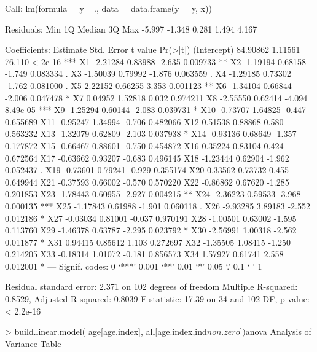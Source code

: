 Call:
lm(formula = y ~ ., data = data.frame(y = y, x))

Residuals:
   Min     1Q Median     3Q    Max 
-5.997 -1.348  0.281  1.494  4.167 

Coefficients:
            Estimate Std. Error t value Pr(>|t|)    
(Intercept) 84.90862    1.11561  76.110  < 2e-16 ***
X1          -2.21284    0.83988  -2.635 0.009733 ** 
X2          -1.19194    0.68158  -1.749 0.083334 .  
X3          -1.50039    0.79992  -1.876 0.063559 .  
X4          -1.29185    0.73302  -1.762 0.081000 .  
X5           2.22152    0.66255   3.353 0.001123 ** 
X6          -1.34104    0.66844  -2.006 0.047478 *  
X7           0.04952    1.52818   0.032 0.974211    
X8          -2.55550    0.62414  -4.094 8.49e-05 ***
X9          -1.25294    0.60144  -2.083 0.039731 *  
X10         -0.73707    1.64825  -0.447 0.655689    
X11         -0.95247    1.34994  -0.706 0.482066    
X12          0.51538    0.88868   0.580 0.563232    
X13         -1.32079    0.62809  -2.103 0.037938 *  
X14         -0.93136    0.68649  -1.357 0.177872    
X15         -0.66467    0.88601  -0.750 0.454872    
X16          0.35224    0.83104   0.424 0.672564    
X17         -0.63662    0.93207  -0.683 0.496145    
X18         -1.23444    0.62904  -1.962 0.052437 .  
X19         -0.73601    0.79241  -0.929 0.355174    
X20          0.33562    0.73732   0.455 0.649944    
X21         -0.37593    0.66002  -0.570 0.570220    
X22         -0.86862    0.67620  -1.285 0.201853    
X23         -1.78443    0.60955  -2.927 0.004215 ** 
X24         -2.36223    0.59533  -3.968 0.000135 ***
X25         -1.17843    0.61988  -1.901 0.060118 .  
X26         -9.93285    3.89183  -2.552 0.012186 *  
X27         -0.03034    0.81001  -0.037 0.970191    
X28         -1.00501    0.63002  -1.595 0.113760    
X29         -1.46378    0.63787  -2.295 0.023792 *  
X30         -2.56991    1.00318  -2.562 0.011877 *  
X31          0.94415    0.85612   1.103 0.272697    
X32         -1.35505    1.08415  -1.250 0.214205    
X33         -0.18314    1.01072  -0.181 0.856573    
X34          1.57927    0.61741   2.558 0.012001 *  
---
Signif. codes:  0 ‘***’ 0.001 ‘**’ 0.01 ‘*’ 0.05 ‘.’ 0.1 ‘ ’ 1

Residual standard error: 2.371 on 102 degrees of freedom
Multiple R-squared:  0.8529,	Adjusted R-squared:  0.8039 
F-statistic: 17.39 on 34 and 102 DF,  p-value: < 2.2e-16







> build.linear.model( age[age.index], all[age.index,ind$non.zero])$anova
Analysis of Variance Table

